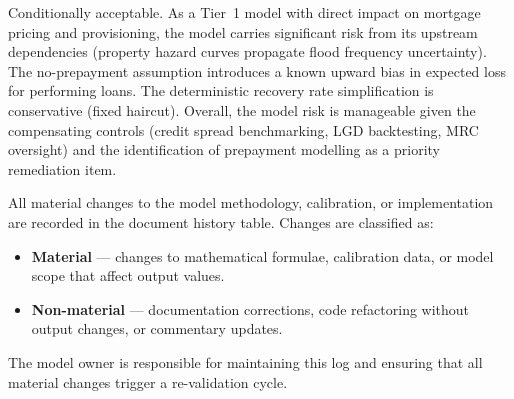 \documentclass[11pt,a4paper]{article}
\begin{document}
Conditionally acceptable. As a Tier~1 model with direct impact on mortgage pricing and provisioning, the model carries significant risk from its upstream dependencies (property hazard curves propagate flood frequency uncertainty). The no-prepayment assumption introduces a known upward bias in expected loss for performing loans. The deterministic recovery rate simplification is conservative (fixed haircut). Overall, the model risk is manageable given the compensating controls (credit spread benchmarking, LGD backtesting, MRC oversight) and the identification of prepayment modelling as a priority remediation item.

\clearpage

\mkmchangelog

All material changes to the model methodology, calibration, or implementation are
recorded in the document history table. Changes are classified as:

\begin{itemize}[nosep]
    \item \textbf{Material} --- changes to mathematical formulae, calibration data, or
          model scope that affect output values.
    \item \textbf{Non-material} --- documentation corrections, code refactoring without
          output changes, or commentary updates.
\end{itemize}

\noindent The model owner is responsible for maintaining this log and ensuring that all
material changes trigger a re-validation cycle.

\end{document}
